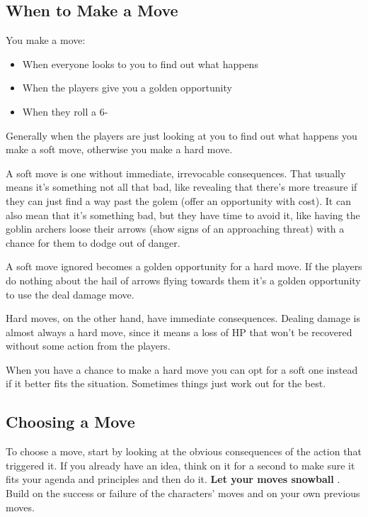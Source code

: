 \subsection{When to Make a Move}


 You make a move:
\begin{itemize}
\item When everyone looks to you to find out what happens
\item When the players give you a golden opportunity
\item When they roll a 6-

\end{itemize}


 Generally when the players are just looking at you to find out what happens you make a soft move, otherwise you make a hard move.


 A soft move is one without immediate, irrevocable consequences. That usually means it's something not all that bad, like revealing that there's more treasure if they can just find a way past the golem (offer an opportunity with cost). It can also mean that it's something bad, but they have time to avoid it, like having the goblin archers loose their arrows (show signs of an approaching threat) with a chance for them to dodge out of danger.


 A soft move ignored becomes a golden opportunity for a hard move. If the players do nothing about the hail of arrows flying towards them it's a golden opportunity to use the deal damage move.


 Hard moves, on the other hand, have immediate consequences. Dealing damage is almost always a hard move, since it means a loss of HP that won't be recovered without some action from the players.


 When you have a chance to make a hard move you can opt for a soft one instead if it better fits the situation. Sometimes things just work out for the best.
\subsection{Choosing a Move}


 To choose a move, start by looking at the obvious consequences of the action that triggered it. If you already have an idea, think on it for a second to make sure it fits your agenda and principles and then do it. \textbf{Let your moves snowball}
. Build on the success or failure of the characters' moves and on your own previous moves.


